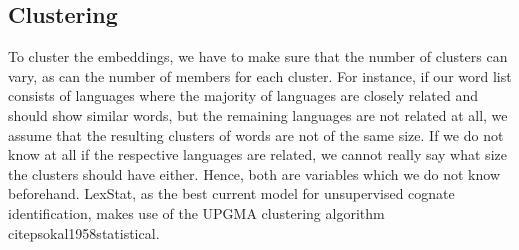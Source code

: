 \documentclass[6pt]{article}
\begin{document}
%

\subsection{Clustering}
\label{Clustering}

To cluster the embeddings, we have to make sure that the number of clusters can vary, as can the number of members for each cluster. For instance, if our word list consists of languages where the majority of languages are closely related and should show similar words, but the remaining languages are not related at all, we assume that the resulting clusters of words are not of the same size. If we do not know at all if the respective languages are related, we cannot really say what size the clusters should have either. Hence, both are variables which we do not know beforehand. LexStat, as the best current model for unsupervised cognate identification, makes use of the UPGMA clustering algorithm citep{sokal1958statistical}. 
\end{document}
